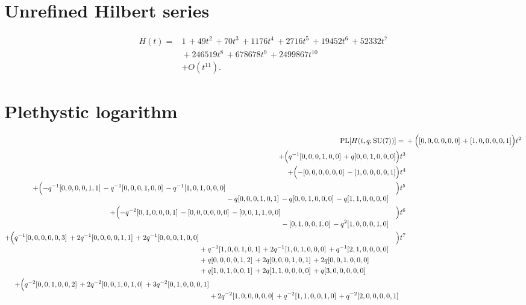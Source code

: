 \documentclass[10pt]{article}
\begin{document}
\section{Unrefined Hilbert series}
\[
\begin{aligned}
H(t) ={}& 1\,+49t^{2}\,+70t^{3}\,+1176t^{4}\,+2716t^{5}\,+19452t^{6}\,+52332t^{7} \\
  &{}+246519t^{8}\,+678678t^{9}\,+2499867t^{10} \\
  &+ O(t^{11}).
\end{aligned}
\]

\section{Plethystic logarithm}
\[
\begin{aligned}
\operatorname{PL}[H(t,q;\mathrm{SU}(7))] ={}&
  + \Bigl([0,0,0,0,0,0]\,+[1,0,0,0,0,1]\Bigr)t^{2} \\
  + \Bigl(q^{-1}[0,0,0,1,0,0]\,+q[0,0,1,0,0,0]\Bigr)t^{3} \\
  + \Bigl(-[0,0,0,0,0,0]\,-[1,0,0,0,0,1]\Bigr)t^{4} \\
  + \Bigl(\begin{aligned}[t]-q^{-1}[0,0,0,0,1,1]\,-q^{-1}[0,0,0,1,0,0]\,-q^{-1}[1,0,1,0,0,0] \\
  &{}-q[0,0,0,1,0,1]\,-q[0,0,1,0,0,0]\,-q[1,1,0,0,0,0]\end{aligned}\Bigr)t^{5} \\
  + \Bigl(\begin{aligned}[t]-q^{-2}[0,1,0,0,0,1]\,-[0,0,0,0,0,0]\,-[0,0,1,1,0,0] \\
  &{}-[0,1,0,0,1,0]\,-q^{2}[1,0,0,0,1,0]\end{aligned}\Bigr)t^{6} \\
  + \Bigl(\begin{aligned}[t]q^{-1}[0,0,0,0,0,3]\,+2q^{-1}[0,0,0,0,1,1]\,+2q^{-1}[0,0,0,1,0,0] \\
  &{}+q^{-1}[1,0,0,1,0,1]\,+2q^{-1}[1,0,1,0,0,0]\,+q^{-1}[2,1,0,0,0,0] \\
  &{}+q[0,0,0,0,1,2]\,+2q[0,0,0,1,0,1]\,+2q[0,0,1,0,0,0] \\
  &{}+q[1,0,1,0,0,1]\,+2q[1,1,0,0,0,0]\,+q[3,0,0,0,0,0]\end{aligned}\Bigr)t^{7} \\
  + \Bigl(\begin{aligned}[t]q^{-2}[0,0,1,0,0,2]\,+2q^{-2}[0,0,1,0,1,0]\,+3q^{-2}[0,1,0,0,0,1] \\
  &{}+2q^{-2}[1,0,0,0,0,0]\,+q^{-2}[1,1,0,0,1,0]\,+q^{-2}[2,0,0,0,0,1] \\

\end{aligned}
\end{aligned}\]
\end{document}

